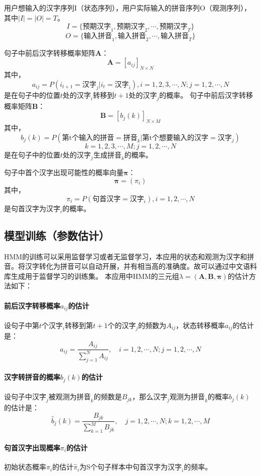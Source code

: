 \documentclass[12pt,a4paper]{ctexart}
\begin{document}
用户想输入的汉字序列I（状态序列），用户实际输入的拼音序列O（观测序列），其中$ |I|=|O|=T $。
\[ I=\{ \mbox{预期汉字}_1,\mbox{预期汉字}_2,\cdots,\mbox{预期汉字}_T \}	\]
\[O=\{ \mbox{输入拼音}_1,\mbox{输入拼音}_2,\cdots,\mbox{输入拼音}_T \}  \]

句子中前后汉字转移概率矩阵$\bm{A}$：
\[ \bm{A}=[a_{ij}]_{N\times N} \]
其中，
\[ a_{ij}=P(i_{t+1}=\mbox{汉字}_j|i_t=\mbox{汉字}_i),  i=1,2,3,\cdots,N; j=1,2,\cdots,N\]
是在句子中的位置$ t $处的$ \mbox{汉字}_i $转移到$ t+1 $处的$ \mbox{汉字}_j $的概率。
句子中前后汉字转移概率矩阵$\bm{B}$：
\[ \bm{B}=[b_j(k)]_{N\times M} \]
其中，
\[ b_j(k)=P(\mbox{第t个输入的拼音}=\mbox{拼音}_k|\mbox{第t个想要输入的汉字}=\mbox{汉字}_j) \]
\[ k=1,2,3,\cdots,M; j=1,2,\cdots,N\]
是在句子中的位置$ t $处的$ \mbox{汉字}_j $生成$ \mbox{拼音}_k $的概率。

句子中首个汉字出现可能性的概率向量$\bm{\pi}$：
\[ \bm{\pi}=(\pi_i) \]
其中，
\[ \pi_i=P(\mbox{句首汉字}=\mbox{汉字}_i), i=1,2,\cdots,N \]
是句首汉字为$\mbox{汉字}_i$的概率。
\subsection{模型训练（参数估计）}
HMM的训练可以采用监督学习或者无监督学习\cite{李航统计学习}，本应用的状态和观测为汉字和拼音。将汉字转化为拼音可以自动开展\cite{python-pinyin}，并有相当高的准确度\cite{accuracy-of-auto-pinyin}。故可以通过中文语料库生成用于监督学习的训练集。
本应用中HMM的三元组$ \lambda=(\bm{A},\bm{B},\bm{\pi}) $的估计方法如下：
\paragraph{前后汉字转移概率$a_{ij}$的估计}
设句子中第$ t $个$\mbox{汉字}_i$转移到第$ t+1 $个的$\mbox{汉字}_j$的频数为$A_{ij}$，状态转移概率$a_{ij}$的估计是：
\[ \hat{a}_{i j}=\frac{A_{ij}}{\sum_{j=1}^{N} A_{i j}}, \quad i=1,2, \cdots, N ; j=1,2, \cdots, N \]
\paragraph{汉字转拼音的概率$b_j(k)$的估计}
设句子中$\mbox{汉字}_j$被观测为$\mbox{拼音}_k$的频数是$B_{j k}$，那么$\mbox{汉字}_j$观测为$\mbox{拼音}_k$的概率$b_{j}(k)$的估计是：
\[ \hat{b}_{j}(k)=\frac{B_{j k}}{\sum_{k=1}^{M} B_{j k}}, \quad j=1,2, \cdots, N ; k=1,2, \cdots, M \]
\paragraph{句首汉字出现概率$\pi_i$的估计}
初始状态概率$\pi_i$的估计$\hat{\pi}_i$为S个句子样本中句首汉字为$\mbox{汉字}_i$的频率。
\end{document}
